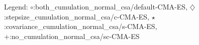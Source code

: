 Legend: {\color{CornflowerBlue}$\circ$}:both\_cumulation\_normal\_csa/default-CMA-ES, {\color{Orange}$\diamondsuit$}:stepsize\_cumulation\_normal\_csa/c-CMA-ES, {\color{Green}$\star$}:covariance\_cumulation\_normal\_csa/s-CMA-ES, {\color{red}+}:no\_cumulation\_normal\_csa/sc-CMA-ES